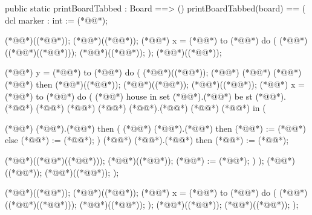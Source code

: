 \begin{vdm_al}
 
  public static printBoardTabbed : Board ==> ()
   printBoardTabbed(board) == (
    dcl marker : int := (*@@*);
   
    (*@@*)((*@@*));
    (*@@*)((*@@*));
    (*@@*) x = (*@@*) to (*@@*) do (
     (*@@*)((*@@*)((*@@*))); 
     (*@@*)((*@@*));
    );
    (*@@*)((*@@*));
    
    (*@@*) y = (*@@*) to (*@@*) do (
     (*@@*)((*@@*));
     (*@@*) (*@@*) (*@\notcovered{<>}@*) (*@@*) then (*@@*)((*@@*));
     (*@@*)((*@@*));
     (*@@*)((*@@*));
     (*@@*) x = (*@@*) to (*@@*) do (
      (*@@*) house in set (*@@*).(*@@*) be st (*@@*).(*@@*) (*@\notcovered{=}@*) (*@@*) (*@@*) (*@@*).(*@@*) (*@\notcovered{=}@*) (*@@*) in (
      
       (*@@*) (*@@*).(*@@*) then (
        (*@@*) (*@@*).(*@@*) then
         (*@@*) := (*@@*)
        else
         (*@@*) := (*@@*);
       )
       (*@@*) (*@@*).(*@@*) then (*@@*) := (*@@*);

       (*@@*)((*@@*)((*@@*)));
       (*@@*)((*@@*));
       (*@@*) := (*@@*);
      )
     );
     (*@@*)((*@@*));
     (*@@*)((*@@*));
    );
 
    (*@@*)((*@@*));
    (*@@*)((*@@*));
    (*@@*) x = (*@@*) to (*@@*) do (
     (*@@*)((*@@*)((*@@*))); 
     (*@@*)((*@@*));
    );
    (*@@*)((*@@*));
    (*@@*)((*@@*));
   );
  

\end{vdm_al}
